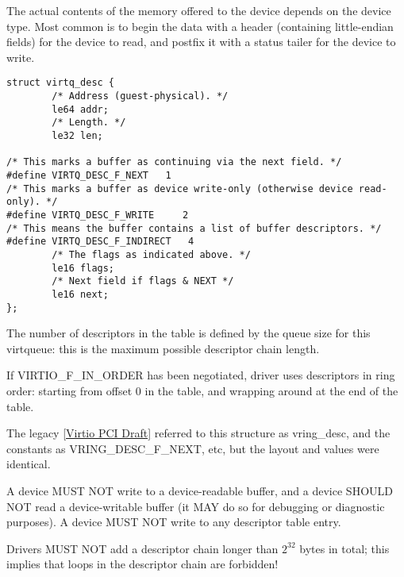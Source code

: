 The actual contents of the memory offered to the device depends on the
device type.  Most common is to begin the data with a header
(containing little-endian fields) for the device to read, and postfix
it with a status tailer for the device to write.

\begin{lstlisting}
struct virtq_desc {
        /* Address (guest-physical). */
        le64 addr;
        /* Length. */
        le32 len;

/* This marks a buffer as continuing via the next field. */
#define VIRTQ_DESC_F_NEXT   1
/* This marks a buffer as device write-only (otherwise device read-only). */
#define VIRTQ_DESC_F_WRITE     2
/* This means the buffer contains a list of buffer descriptors. */
#define VIRTQ_DESC_F_INDIRECT   4
        /* The flags as indicated above. */
        le16 flags;
        /* Next field if flags & NEXT */
        le16 next;
};
\end{lstlisting}

The number of descriptors in the table is defined by the queue size
for this virtqueue: this is the maximum possible descriptor chain length.

If VIRTIO_F_IN_ORDER has been negotiated, driver uses
descriptors in ring order: starting from offset 0 in the table,
and wrapping around at the end of the table.

\begin{note}
The legacy \hyperref[intro:Virtio PCI Draft]{[Virtio PCI Draft]}
referred to this structure as vring_desc, and the constants as
VRING_DESC_F_NEXT, etc, but the layout and values were identical.
\end{note}

A device MUST NOT write to a device-readable buffer, and a device SHOULD NOT
read a device-writable buffer (it MAY do so for debugging or diagnostic
purposes). A device MUST NOT write to any descriptor table entry.

Drivers MUST NOT add a descriptor chain longer than $2^{32}$ bytes in total;
this implies that loops in the descriptor chain are forbidden!

